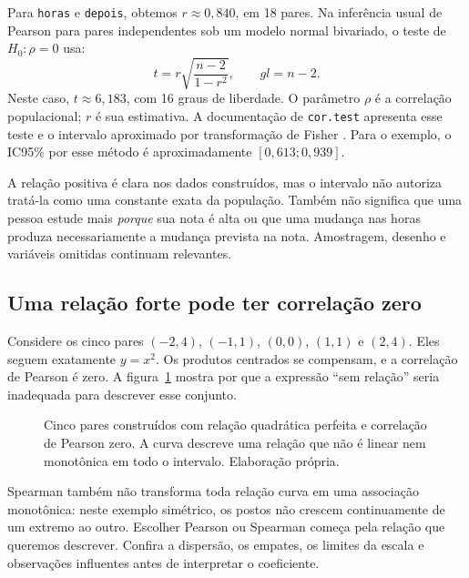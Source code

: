 Para \texttt{horas} e \texttt{depois}, obtemos $r\approx0{,}840$, em 18 pares. Na inferência usual de Pearson para pares independentes sob um modelo normal bivariado, o teste de $H_0:\rho=0$ usa:
\[
t=r\sqrt{\frac{n-2}{1-r^2}},\qquad gl=n-2.
\]
Neste caso, $t\approx6{,}183$, com 16 graus de liberdade. O parâmetro $\rho$ é a correlação populacional; $r$ é sua estimativa. A documentação de \texttt{cor.test} apresenta esse teste e o intervalo aproximado por transformação de Fisher \parencite{RCorrelacao}. Para o exemplo, o IC95\% por esse método é aproximadamente $[0{,}613;0{,}939]$.

A relação positiva é clara nos dados construídos, mas o intervalo não autoriza tratá-la como uma constante exata da população. Também não significa que uma pessoa estude mais \textit{porque} sua nota é alta ou que uma mudança nas horas produza necessariamente a mudança prevista na nota. Amostragem, desenho e variáveis omitidas continuam relevantes.

\subsection{Uma relação forte pode ter correlação zero}

Considere os cinco pares $(-2,4)$, $(-1,1)$, $(0,0)$, $(1,1)$ e $(2,4)$. Eles seguem exatamente $y=x^2$. Os produtos centrados se compensam, e a correlação de Pearson é zero. A figura~\ref{fig:correlacao-curva} mostra por que a expressão ``sem relação'' seria inadequada para descrever esse conjunto.

\begin{figure}[H]
\centering
{}
\caption{Cinco pares construídos com relação quadrática perfeita e correlação de Pearson zero. A curva descreve uma relação que não é linear nem monotônica em todo o intervalo. Elaboração própria.}
\label{fig:correlacao-curva}
\end{figure}

Spearman também não transforma toda relação curva em uma associação monotônica: neste exemplo simétrico, os postos não crescem continuamente de um extremo ao outro. Escolher Pearson ou Spearman começa pela relação que queremos descrever. Confira a dispersão, os empates, os limites da escala e observações influentes antes de interpretar o coeficiente.

